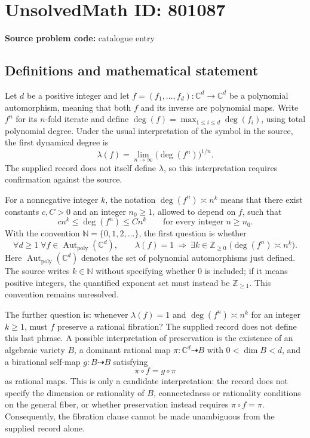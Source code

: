 \documentclass[11pt]{article}
\newcommand{\N}{\mathbb{N}}
\newcommand{\Z}{\mathbb{Z}}
\newcommand{\C}{\mathbb{C}}
\begin{document}
\section*{UnsolvedMath ID: 801087}
\textbf{Source problem code:} catalogue entry
\subsection{Definitions and mathematical statement}
Let \(d\) be a positive integer and let \(f=(f_1,\ldots,f_d):\C^d\to\C^d\) be a polynomial automorphism, meaning that both \(f\) and its inverse are polynomial maps. Write \(f^n\) for its \(n\)-fold iterate and define \(\deg(f)=\max_{1\le i\le d}\deg(f_i)\), using total polynomial degree. Under the usual interpretation of the symbol in the source, the first dynamical degree is
\[
\lambda(f)=\lim_{n\to\infty}\bigl(\deg(f^n)\bigr)^{1/n}.
\]
The supplied record does not itself define \(\lambda\), so this interpretation requires confirmation against the source.

For a nonnegative integer \(k\), the notation \(\deg(f^n)\asymp n^k\) means that there exist constants \(c,C>0\) and an integer \(n_0\ge1\), allowed to depend on \(f\), such that
\[
c n^k\le\deg(f^n)\le C n^k\qquad\text{for every integer }n\ge n_0.
\]
With the convention \(\N=\{0,1,2,\ldots\}\), the first question is whether
\[
\forall d\ge1\;\forall f\in\operatorname{Aut}_{\mathrm{poly}}(\C^d),\qquad
\lambda(f)=1\ \Longrightarrow\ \exists k\in\Z_{\ge0}\;\bigl(\deg(f^n)\asymp n^k\bigr).
\]
Here \(\operatorname{Aut}_{\mathrm{poly}}(\C^d)\) denotes the set of polynomial automorphisms just defined. The source writes \(k\in\N\) without specifying whether \(0\) is included; if it means positive integers, the quantified exponent set must instead be \(\Z_{\ge1}\). This convention remains unresolved.

The further question is: whenever \(\lambda(f)=1\) and \(\deg(f^n)\asymp n^k\) for an integer \(k\ge1\), must \(f\) preserve a rational fibration? The supplied record does not define this last phrase. A possible interpretation of preservation is the existence of an algebraic variety \(B\), a dominant rational map \(\pi:\C^d\dashrightarrow B\) with \(0<\dim B<d\), and a birational self-map \(g:B\dashrightarrow B\) satisfying
\[
\pi\circ f=g\circ\pi
\]
as rational maps. This is only a candidate interpretation: the record does not specify the dimension or rationality of \(B\), connectedness or rationality conditions on the general fiber, or whether preservation instead requires \(\pi\circ f=\pi\). Consequently, the fibration clause cannot be made unambiguous from the supplied record alone.
\end{document}
